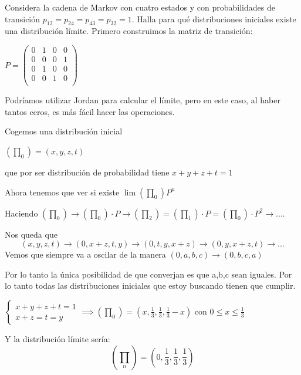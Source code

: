 \begin{problem}[2]
	Considera la cadena de Markov con cuatro estados y con probabilidades de transición
	$p_{12} = p_{24} = p_{43} = p_{32} = 1$. Halla para qué distribuciones iniciales existe una distribución
	límite.
	\solution
	Primero construimos la matriz de transición:

	$P = \left(\begin{matrix}
	0&1&0&0\\0&0&0&1\\0&1&0&0\\0&0&1&0\\
	\end{matrix}\right)$

	Podríamos utilizar Jordan para calcular el límite, pero en este caso, al haber tantos ceros, es más fácil hacer las operaciones.

	Cogemos una distribución inicial

	$(\prod_0)= (x,y,z,t)$

	que por ser distribución de probabilidad tiene $x+y+z+t=1$

	Ahora tenemos que ver si existe $\lim (\prod_0) P^n $

	Haciendo $(\prod_0) \rightarrow (\prod_0)\cdot P \rightarrow (\prod_2) = (\prod_1) \cdot P = (\prod_0)\cdot P^2 \rightarrow . . . . $

	Nos queda que
	$$(x,y,z,t) \rightarrow (0,x+z ,t,y) \rightarrow (0,t,y,x + z)\rightarrow(0,y,x+z,t) \rightarrow . . . $$
	Vemos que siempre va a oscilar de la manera $(0,a,b,c) \rightarrow (0,b ,c,a)$

	Por lo tanto la única posibilidad de que converjan es que a,b,c sean iguales. Por lo tanto todas las distribuciones iniciales que estoy buscando tienen que cumplir.

	$\begin{cases}
		 x + y + z + t = 1\\
		 x+z=t=y
	\end{cases} \implies (\prod_0) = (x,\frac{1}{3} , \frac{1}{3},\frac{1}{3} -x)$ con $0 \leq x \leq \frac{1}{3}$

	Y la distribución límite sería:
	$$\left(\prod_n\right) = \left(0, \frac{1}{3}, \frac{1}{3}, \frac{1}{3}\right)$$
\end{problem}


